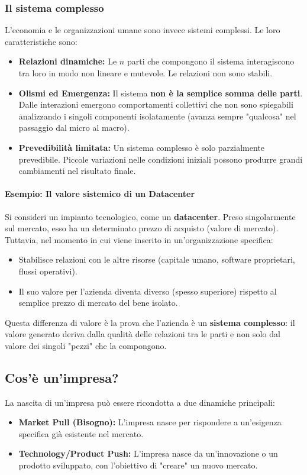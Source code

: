 \documentclass[a4paper,12pt]{article}
\begin{document}
	\subsubsection{Il sistema complesso}
	L'economia e le organizzazioni umane sono invece sistemi complessi. Le loro caratteristiche sono:
	\begin{itemize}
		\item \textbf{Relazioni dinamiche:} Le $n$ parti che compongono il sistema interagiscono tra loro in modo non lineare e mutevole. Le relazioni non sono stabili.
		\item \textbf{Olismi ed Emergenza:} Il sistema \textbf{non è la semplice somma delle parti}. Dalle interazioni emergono comportamenti collettivi che non sono spiegabili analizzando i singoli componenti isolatamente (avanza sempre "qualcosa" nel passaggio dal micro al macro).
		\item \textbf{Prevedibilità limitata:} Un sistema complesso è solo parzialmente prevedibile. Piccole variazioni nelle condizioni iniziali possono produrre grandi cambiamenti nel risultato finale.
	\end{itemize}
	
	\paragraph{Esempio: Il valore sistemico di un Datacenter}
	Si consideri un impianto tecnologico, come un \textbf{datacenter}. Preso singolarmente sul mercato, esso ha un determinato prezzo di acquisto (valore di mercato). Tuttavia, nel momento in cui viene inserito in un'organizzazione specifica:
	\begin{itemize}
		\item Stabilisce relazioni con le altre risorse (capitale umano, software proprietari, flussi operativi).
		\item Il suo valore per l'azienda diventa diverso (spesso superiore) rispetto al semplice prezzo di mercato del bene isolato.
	\end{itemize}
	Questa differenza di valore è la prova che l'azienda è un \textbf{sistema complesso}: il valore generato deriva dalla qualità delle relazioni tra le parti e non solo dal valore dei singoli "pezzi" che la compongono. 
	
	\subsection{Cos'è un'impresa?}
	La nascita di un'impresa può essere ricondotta a due dinamiche principali:
	\begin{itemize}
		\item \textbf{Market Pull (Bisogno):} L'impresa nasce per rispondere a un'esigenza specifica già esistente nel mercato.
		\item \textbf{Technology/Product Push:} L'impresa nasce da un'innovazione o un prodotto sviluppato, con l'obiettivo di "creare" un nuovo mercato.
	\end{itemize}
	
\end{document}
